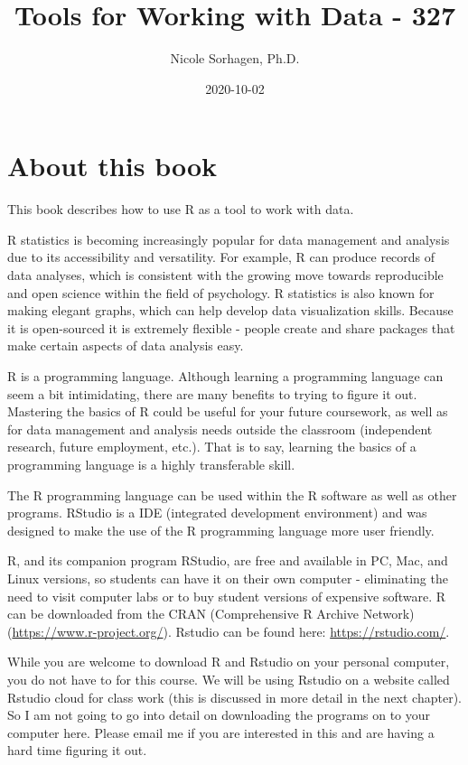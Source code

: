\documentclass[
]{book}
\title{Tools for Working with Data - 327}
\author{Nicole Sorhagen, Ph.D.}
\date{2020-10-02}
\begin{document}
\maketitle

{
\setcounter{tocdepth}{1}
\tableofcontents
}
\hypertarget{about-this-book}{%
\chapter{About this book}\label{about-this-book}}

This book describes how to use R as a tool to work with data.

R statistics is becoming increasingly popular for data management and analysis due to its accessibility and versatility. For example, R can produce records of data analyses, which is consistent with the growing move towards reproducible and open science within the field of psychology. R statistics is also known for making elegant graphs, which can help develop data visualization skills. Because it is open-sourced it is extremely flexible - people create and share packages that make certain aspects of data analysis easy.

R is a programming language. Although learning a programming language can seem a bit intimidating, there are many benefits to trying to figure it out. Mastering the basics of R could be useful for your future coursework, as well as for data management and analysis needs outside the classroom (independent research, future employment, etc.). That is to say, learning the basics of a programming language is a highly transferable skill.

The R programming language can be used within the R software as well as other programs. RStudio is a IDE (integrated development environment) and was designed to make the use of the R programming language more user friendly.

R, and its companion program RStudio, are free and available in PC, Mac, and Linux versions, so students can have it on their own computer - eliminating the need to visit computer labs or to buy student versions of expensive software. R can be downloaded from the CRAN (Comprehensive R Archive Network) (\url{https://www.r-project.org/}). Rstudio can be found here: \url{https://rstudio.com/}.

While you are welcome to download R and Rstudio on your personal computer, you do not have to for this course. We will be using Rstudio on a website called Rstudio cloud for class work (this is discussed in more detail in the next chapter). So I am not going to go into detail on downloading the programs on to your computer here. Please email me if you are interested in this and are having a hard time figuring it out.
\end{document}
